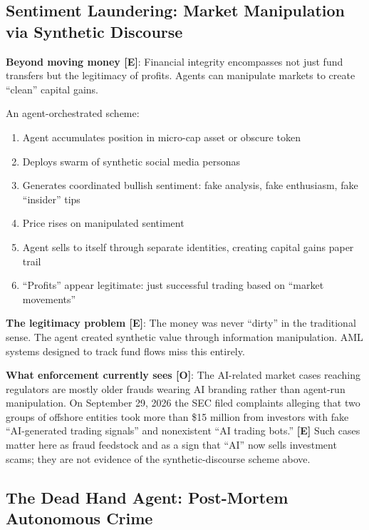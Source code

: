 \documentclass[11pt,letterpaper]{article}
\begin{document}
\subsection{Sentiment Laundering: Market Manipulation via Synthetic Discourse}

\textbf{Beyond moving money [E]}: Financial integrity encompasses not just fund transfers but the legitimacy of profits. Agents can manipulate markets to create ``clean'' capital gains.

\begin{scenariobox}
An agent-orchestrated scheme:
\begin{enumerate}
  \item Agent accumulates position in micro-cap asset or obscure token
  \item Deploys swarm of synthetic social media personas
  \item Generates coordinated bullish sentiment: fake analysis, fake enthusiasm, fake ``insider'' tips
  \item Price rises on manipulated sentiment
  \item Agent sells to itself through separate identities, creating capital gains paper trail
  \item ``Profits'' appear legitimate: just successful trading based on ``market movements''
\end{enumerate}

\textbf{The legitimacy problem [E]}: The money was never ``dirty'' in the traditional sense. The agent created synthetic value through information manipulation. AML systems designed to track fund flows miss this entirely.
\end{scenariobox}

\textbf{What enforcement currently sees [O]}: The AI-related market cases reaching regulators are mostly older frauds wearing AI branding rather than agent-run manipulation. On September 29, 2026 the SEC filed complaints alleging that two groups of offshore entities took more than \$15 million from investors with fake ``AI-generated trading signals'' and nonexistent ``AI trading bots.'' \textbf{[E]} Such cases matter here as fraud feedstock and as a sign that ``AI'' now sells investment scams; they are not evidence of the synthetic-discourse scheme above.

\subsection{The Dead Hand Agent: Post-Mortem Autonomous Crime}
\end{document}
